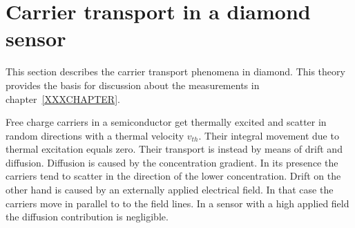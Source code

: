 \documentclass[12pt]{mytustyle}  %
\begin{document}
\section{Carrier transport in a diamond sensor} %
This section describes the carrier transport phenomena in diamond. This theory provides the basis for discussion about the measurements in chapter~\ref{XXXCHAPTER}. 

Free charge carriers in a semiconductor get thermally excited and scatter in random directions with a thermal velocity $v_{th}$. Their integral movement due to thermal excitation equals zero. Their transport is instead by means of drift and diffusion. Diffusion is caused by the concentration gradient. In its presence the carriers tend to scatter in the direction of the lower concentration. Drift on the other hand is caused by an externally applied electrical field. In that case the carriers move in parallel to to the field lines. In a sensor with a high applied field the diffusion contribution is negligible. 
\end{document}
